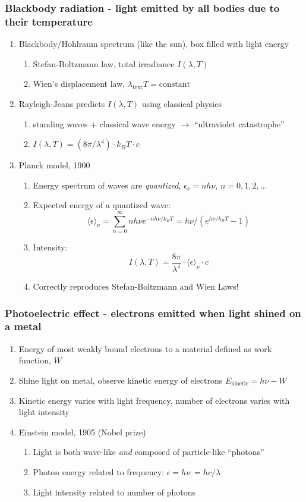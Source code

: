 \documentclass[11pt]{article}
\begin{document}
\subsubsection{Blackbody radiation - light emitted by all bodies due to their temperature}
\label{sec:org0b72916}
\begin{enumerate}
\item Blackbody/Hohlraum spectrum (like the sun), box filled with light energy
\begin{enumerate}
\item Stefan-Boltzmann law, total irradiance \(I(\lambda,T)\)
\item Wien's displacement law, \(\lambda_\mathrm{text}T = \mathrm{constant}\)
\end{enumerate}
\item Rayleigh-Jeans predicts \(I(\lambda,T)\) using classical physics
\begin{enumerate}
\item standing waves + classical wave energy \(\rightarrow\) ``ultraviolet catastrophe''
\item \(I(\lambda, T) = (8\pi/\lambda^4) \cdot k_B T \cdot c\)
\end{enumerate}
\item Planck model, 1900
\begin{enumerate}
\item Energy spectrum of waves are \emph{quantized}, \(\epsilon_\nu=nh\nu\), \(n = 0,1,2, \ldots\)
\item Expected energy of a quantized wave: 
\[\langle \epsilon \rangle_\nu = \sum_{n=0}^\infty nh\nu e^{-nh\nu/k_BT} = h\nu/\left (
          e^{h\nu/k_BT}-1 \right )\]
\item Intensity:
\[I(\lambda, T) = \frac{8\pi}{\lambda^4} \cdot \langle\epsilon \rangle_\nu \cdot c \]
\item Correctly reproduces Stefan-Boltzmann and Wien Laws!
\end{enumerate}
\end{enumerate}
\subsubsection{Photoelectric effect - electrons emitted when light shined on a metal}
\label{sec:orgb239ad0}
\begin{enumerate}
\item Energy of most weakly bound electrons to a material defined as work function, \(W\)
\item Shine light on metal, observe kinetic energy of electrons \(E_\text{kinetic}=h\nu -W\)
\item Kinetic energy varies with light frequency, number of electrons varies with light intensity
\item Einstein model, 1905 (Nobel prize)
\begin{enumerate}
\item Light is both wave-like \emph{and} composed of particle-like ``photons''
\item Photon energy related to frequency: \(\epsilon = h \nu\ = hc/\lambda\)
\item Light intensity related to number of photons
\end{enumerate}
\end{enumerate}
\end{document}
